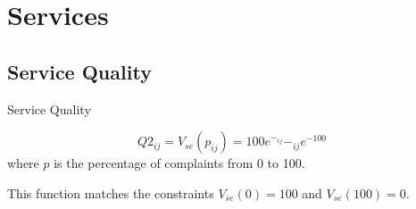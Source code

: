 \documentclass[8pt, hyperref={colorlinks=true}]{beamer}
\begin{document}
\section{Services}

\subsection{Service Quality}

\begin{frame}{Service Quality}


\begin{definition}
\[
Q2_{ij}=V_{se}\left(p_{ij}\right) = 100e^{-_{ij}} - _{ij}e^{-100}
\]
where $p$ is the percentage of complaints from 0 to 100.
\end{definition}

This function matches the constraints $V_{se}\left(0\right) = 100$ and $V_{se}\left(100\right) = 0.$


\end{frame}
\end{document}
